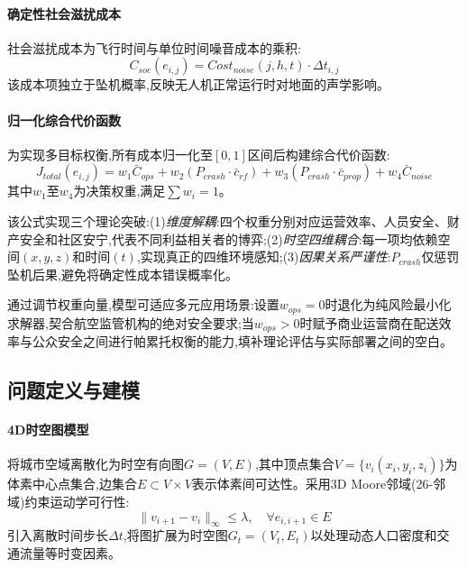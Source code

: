 \paragraph{确定性社会滋扰成本}

社会滋扰成本为飞行时间与单位时间噪音成本的乘积:
\begin{equation}
C_{soc}(e_{i,j}) = Cost_{noise}(j, h, t) \cdot \Delta t_{i,j}
\label{eq:social_nuisance}
\end{equation}
该成本项独立于坠机概率,反映无人机正常运行时对地面的声学影响。

\paragraph{归一化综合代价函数}

为实现多目标权衡,所有成本归一化至$[0, 1]$区间后构建综合代价函数:
\begin{equation}
J_{total}(e_{i,j}) = w_1 \bar{C}_{ops} + w_2 \left( P_{crash} \cdot \bar{c}_{rf} \right) + w_3 \left( P_{crash} \cdot \bar{c}_{prop} \right) + w_4 \bar{C}_{noise}
\label{eq:normalized_total_cost}
\end{equation}
其中$w_1$至$w_4$为决策权重,满足$\sum w_i = 1$。

该公式实现三个理论突破:(1)\textit{维度解耦}:四个权重分别对应运营效率、人员安全、财产安全和社区安宁,代表不同利益相关者的博弈;(2)\textit{时空四维耦合}:每一项均依赖空间$(x,y,z)$和时间$(t)$,实现真正的四维环境感知;(3)\textit{因果关系严谨性}:$P_{crash}$仅惩罚坠机后果,避免将确定性成本错误概率化。

通过调节权重向量,模型可适应多元应用场景:设置$w_{ops}=0$时退化为纯风险最小化求解器,契合航空监管机构的绝对安全要求;当$w_{ops}>0$时赋予商业运营商在配送效率与公众安全之间进行帕累托权衡的能力,填补理论评估与实际部署之间的空白。

\subsection{问题定义与建模}

\paragraph{4D时空图模型}

将城市空域离散化为时空有向图$G=(V,E)$,其中顶点集合$V=\{v_i(x_i,y_i,z_i)\}$为体素中心点集合,边集合$E\subset V\times V$表示体素间可达性。采用3D Moore邻域(26-邻域)约束运动学可行性:
\begin{equation}
\| v_{i+1} - v_i \|_{\infty} \leq \lambda, \quad \forall e_{i,i+1} \in E
\label{eq:kinematic_constraint}
\end{equation}
引入离散时间步长$\Delta t$,将图扩展为时空图$G_t=(V_t,E_t)$以处理动态人口密度和交通流量等时变因素。

